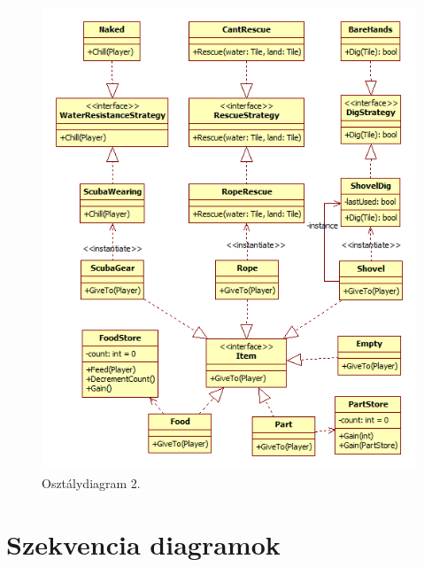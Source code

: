 \begin{figure}[H]
	\begin{center}
		\includegraphics[width=17cm]{chapters/chapter04/ClassDiagramPart2.png}
		\caption{Osztálydiagram 2.}
		\label{fig:OsztalyDiagramPart2}
	\end{center}
\end{figure}

\section{Szekvencia diagramok}

